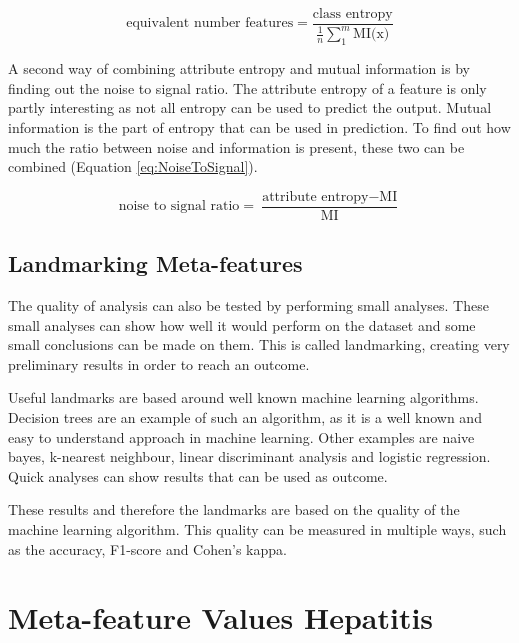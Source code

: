 \documentclass[10pt,a4paper]{report}
\begin{document}
\begin{itemize}
		\begin{equation}\label{eq:EqNumFeat}
		\text{equivalent number features} = \frac{\text{class entropy}}{\frac{1}{n}\sum_1^m\text{MI(x)}}
		\end{equation}
		
		A second way of combining attribute entropy and mutual information is by finding out the noise to signal ratio. The attribute entropy of a feature is only partly interesting as not all entropy can be used to predict the output. Mutual information is the part of entropy that can be used in prediction. To find out how much the ratio between noise and information is present, these two can be combined (Equation \ref{eq:NoiseToSignal}).
		
		\begin{equation}\label{eq:NoiseToSignal}
		\text{noise to signal ratio} = \frac{\text{attribute entropy} - \text{MI}}{\text{MI}}
		\end{equation}
		
	\end{itemize}
	
	\subsection{Landmarking Meta-features}
	\label{subsec:LandmarkingMF}
	
	The quality of analysis can also be tested by performing small analyses. These small analyses can show how well it would perform on the dataset and some small conclusions can be made on them. This is called landmarking, creating very preliminary results in order to reach an outcome\cite{pfahringer2000meta}.
	
	Useful landmarks are based around well known machine learning algorithms. Decision trees are an example of such an algorithm, as it is a well known and easy to understand approach in machine learning.  Other examples are naive bayes, k-nearest neighbour, linear discriminant analysis and logistic regression. Quick analyses can show results that can be used as outcome.
	
	These results and therefore the landmarks are based on the quality of the machine learning algorithm. This quality can be measured in multiple ways, such as the accuracy, F1-score and Cohen's kappa.
	
	\section{Meta-feature Values Hepatitis}
	\label{app:MetafeatureValuesHepatitis}
	
\end{document}
